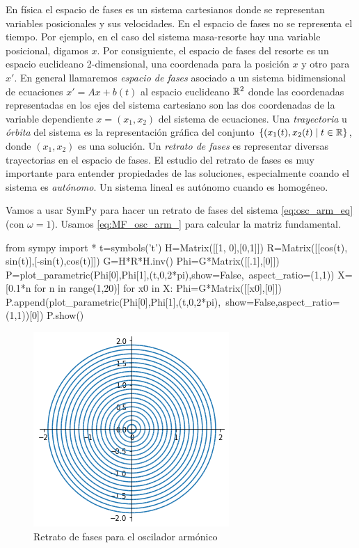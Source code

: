En física el espacio de fases es un sistema cartesianos donde se representan variables posicionales y sus velocidades. En el espacio de fases no se representa el tiempo.  Por ejemplo, en el caso del sistema masa-resorte hay una variable posicional, digamos $x$. Por consiguiente, el espacio de fases del resorte es un espacio euclideano 2-dimensional, una coordenada  para la posición  $x$ y otro para $x'$.  En general llamaremos \emph{espacio de fases} asociado a un sistema bidimensional de ecuaciones $x'=Ax+b(t)$ al espacio euclideano $\mathbb{R}^2$ donde las coordenadas representadas en los ejes del sistema cartesiano son las dos coordenadas de la variable dependiente  $x=(x_1,x_2)$ del sistema de ecuaciones. Una \emph{trayectoria} u \emph{órbita} del sistema es la representación gráfica del conjunto $\{(x_1(t),x_2(t)\mid t\in\mathbb{R}\}$, donde $(x_1,x_2)$ es una solución. Un  \emph{retrato de fases} es representar diversas trayectorias en el espacio de fases. El estudio del retrato de fases es muy importante para entender propiedades de las soluciones, especialmente coando el sistema es \emph{autónomo}. Un sistema lineal es autónomo cuando es homogéneo.

\begin{ejemplo}{} Vamos a usar SymPy para hacer un retrato de fases del sistema \eqref{eq:osc_arm_eq} (con $\omega=1$). Usamos \eqref{eq:MF_osc_arm_} para calcular la matriz fundamental.


\begin{sympyverbatim}[][numbers=left,frame=single,framesep=5mm]
from sympy import *
t=symbols('t')
H=Matrix([[1, 0],[0,1]])
R=Matrix([[cos(t), sin(t)],[-sin(t),cos(t)]])
G=H*R*H.inv()
Phi=G*Matrix([[.1],[0]])
P=plot_parametric(Phi[0],Phi[1],(t,0,2*pi),show=False,\
    aspect_ratio=(1,1))
X=[0.1*n for n in range(1,20)]
for x0 in X:
    Phi=G*Matrix([[x0],[0]])
    P.append(plot_parametric(Phi[0],Phi[1],(t,0,2*pi),\
        show=False,aspect_ratio=(1,1))[0])
P.show()
\end{sympyverbatim}
\begin{figure}[h]
\begin{center}
\includegraphics{imagenes/RetratoFasesOsc.png}
\end{center}
\caption{Retrato de fases para el oscilador armónico}\label{fig:osc_arm}
\end{figure}
\end{ejemplo}




